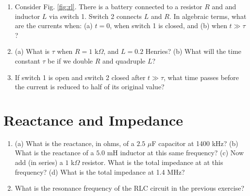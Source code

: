 \documentclass{article}
\begin{document}
\begin{enumerate}
\item Consider Fig. \ref{fig:rl}.  There is a battery connected to a resistor $R$ and and inductor $L$ via switch 1.  Switch 2 connects $L$ and $R$.  In algebraic terms, what are the currents when: (a) $t=0$, when switch 1 is closed, and (b) when $t\gg\tau$? \\ \vspace{2.5cm}
\item (a) What is $\tau$ when $R = 1$ k$\Omega$, and $L = 0.2$ Henries? (b) What will the time constant $\tau$ be if we double $R$ and quadruple $L$? \\ \vspace{2cm}
\item If switch 1 is open and switch 2 closed after $t\gg\tau$, what time passes before the current is reduced to half of its original value? \\ \vspace{2cm}
\end{enumerate}

\section{Reactance and Impedance}

\begin{enumerate}
\item (a) What is the reactance, in ohms, of a $2.5$ $\mu$F capacitor at 1400 kHz? (b) What is the reactance of a $5.0$ mH inductor at this same frequency? (c) Now add (in series) a $1$ k$\Omega$ resistor.  What is the total impedance at at this frequency? (d) What is the total impedance at 1.4 MHz? \\ \vspace{3cm}
\item What is the resonance frequency of the RLC circuit in the previous exercise?
\end{enumerate}
\end{document}
